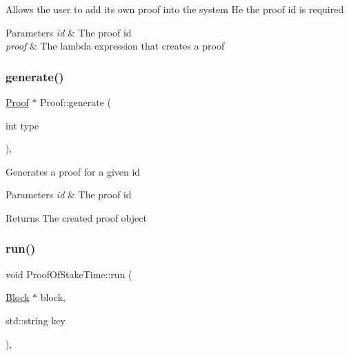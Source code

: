 Allows the user to add its own proof into the system He the proof id is required


\begin{DoxyParams}{Parameters}
{\em id} & The proof id \\
\hline
{\em proof} & The lambda expression that creates a proof \\
\hline
\end{DoxyParams}
\mbox{\label{classProof_a267f0f4587babb59884b5f280e2d54c8}} 
\subsubsection{\texorpdfstring{generate()}{generate()}}
{\footnotesize\ttfamily \mbox{\hyperlink{classProof}{Proof}} $\ast$ Proof\+::generate (\begin{DoxyParamCaption}\item[{int}]{type }\end{DoxyParamCaption})\hspace{0.3cm}{\ttfamily [static]}, {\ttfamily [inherited]}}

Generates a proof for a given id


\begin{DoxyParams}{Parameters}
{\em id} & The proof id \\
\hline
\end{DoxyParams}
\begin{DoxyReturn}{Returns}
The created proof object 
\end{DoxyReturn}
\mbox{\label{classProofOfStakeTime_ad4a49d7ccee740f307c03a13d314d3fb}} 
\subsubsection{\texorpdfstring{run()}{run()}}
{\footnotesize\ttfamily void Proof\+Of\+Stake\+Time\+::run (\begin{DoxyParamCaption}\item[{\mbox{\hyperlink{classBlock}{Block}} $\ast$}]{block,  }\item[{std\+::string}]{key }\end{DoxyParamCaption})\hspace{0.3cm}{\ttfamily [override]}, {\ttfamily [virtual]}}

